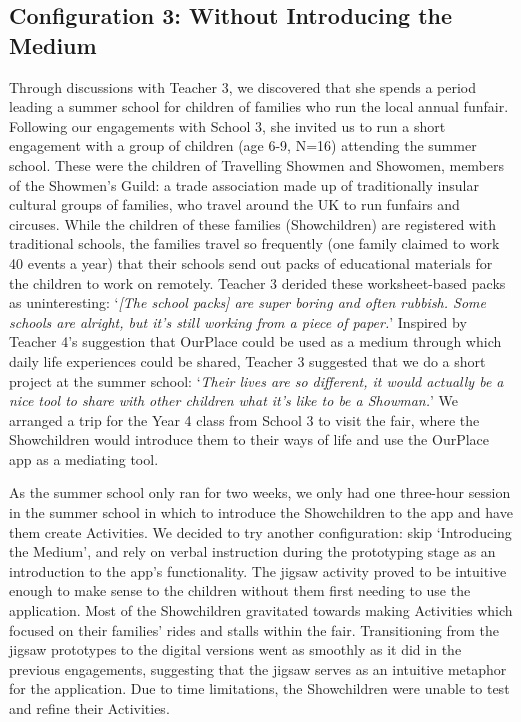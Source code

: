\documentclass[,hyphens]{sigchi}
\begin{document}
\subsection{Configuration 3: Without Introducing the Medium}
Through discussions with Teacher 3, we discovered that she spends a period leading a summer school for children of families who run the local annual funfair. Following our engagements with School 3, she invited us to run a short engagement with a group of children (age 6-9, N=16) attending the summer school. These were the children of Travelling Showmen and Showomen, members of the Showmen's Guild: a trade association made up of traditionally insular cultural groups of families, who travel around the UK to run funfairs and circuses. While the children of these families (Showchildren) are registered with traditional schools, the families travel so frequently (one family claimed to work 40 events a year) that their schools send out packs of educational materials for the children to work on remotely. Teacher 3 derided these worksheet-based packs as uninteresting: `\textit{[The school packs] are super boring and often rubbish. Some schools are alright, but it's still working from a piece of paper.}' Inspired by Teacher 4's suggestion that OurPlace could be used as a medium through which daily life experiences could be shared, Teacher 3 suggested that we do a short project at the summer school: `\textit{Their lives are so different, it would actually be a nice tool to share with other children what it's like to be a Showman.}' We arranged a trip for the Year 4 class from School 3 to visit the fair, where the Showchildren would introduce them to their ways of life and use the OurPlace app as a mediating tool.

As the summer school only ran for two weeks, we only had one three-hour session in the summer school in which to introduce the Showchildren to the app and have them create Activities. We decided to try another configuration: skip `Introducing the Medium', and rely on verbal instruction during the prototyping stage as an introduction to the app's functionality. The jigsaw activity proved to be intuitive enough to make sense to the children without them first needing to use the application. Most of the Showchildren gravitated towards making Activities which focused on their families' rides and stalls within the fair. Transitioning from the jigsaw prototypes to the digital versions went as smoothly as it did in the previous engagements, suggesting that the jigsaw serves as an intuitive metaphor for the application. Due to time limitations, the Showchildren were unable to test and refine their Activities.
\end{document}

